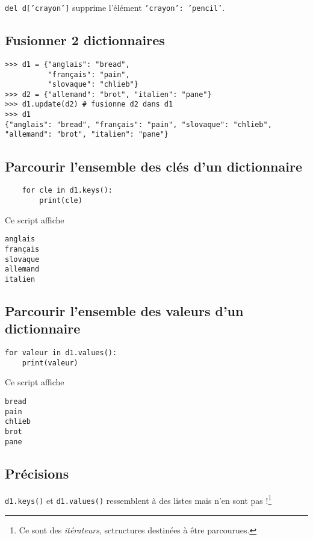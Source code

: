 \texttt{del d['crayon']} supprime l'élément \texttt{'crayon': 'pencil'}.

\subsection{Fusionner 2 dictionnaires}
\begin{verbatim}
>>> d1 = {"anglais": "bread", 
          "français": "pain", 
          "slovaque": "chlieb"}
>>> d2 = {"allemand": "brot", "italien": "pane"}
>>> d1.update(d2) # fusionne d2 dans d1
>>> d1
{"anglais": "bread", "français": "pain", "slovaque": "chlieb", "allemand": "brot", "italien": "pane"}
\end{verbatim}

\subsection{Parcourir l'ensemble des clés d'un dictionnaire}
\begin{pyc}
    \begin{verbatim}
    for cle in d1.keys():
        print(cle)
    \end{verbatim}
\end{pyc}
Ce script affiche
\begin{verbatim}
anglais
français
slovaque
allemand
italien
\end{verbatim}

\subsection{Parcourir l'ensemble des valeurs d'un dictionnaire}
\begin{pyc}
    \begin{verbatim}
for valeur in d1.values():
    print(valeur)
\end{verbatim}
\end{pyc}
Ce script affiche
\begin{verbatim}
bread
pain
chlieb
brot
pane
\end{verbatim}

\subsection{Précisions}
\texttt{d1.keys()} et \texttt{d1.values()} ressemblent à des listes mais n'en sont pas !\footnote{Ce sont des \textit{itérateurs}, sctructures destinées à être parcourues. }\\

